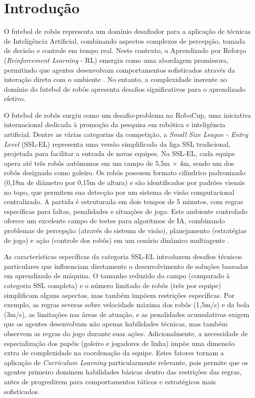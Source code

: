 \chapter{Introdução}
\label{cap:intro}

O futebol de robôs representa um domínio desafiador para a aplicação de técnicas de Inteligência Artificial, combinando aspectos complexos de percepção, tomada de decisão e controle em tempo real. Neste contexto, o Aprendizado por Reforço (\textit{Reinforcement Learning} - RL) emergiu como uma abordagem promissora, permitindo que agentes desenvolvam comportamentos sofisticados através da interação direta com o ambiente \cite{sutton}. No entanto, a complexidade inerente ao domínio do futebol de robôs apresenta desafios significativos para o aprendizado efetivo.

O futebol de robôs surgiu como um desafio-problema na RoboCup, uma iniciativa internacional dedicada à promoção da pesquisa em robótica e inteligência artificial. Dentre as várias categorias da competição, a \textit{Small Size League - Entry Level} (SSL-EL) representa uma versão simplificada da liga SSL tradicional, projetada para facilitar a entrada de novas equipes. Na SSL-EL, cada equipe opera até três robôs autônomos em um campo de 5,5m × 4m, sendo um dos robôs designado como goleiro. Os robôs possuem formato cilíndrico padronizado (0,18m de diâmetro por 0,15m de altura) e são identificados por padrões visuais no topo, que permitem sua detecção por um sistema de visão computacional centralizado. A partida é estruturada em dois tempos de 5 minutos, com regras específicas para faltas, penalidades e situações de jogo. Este ambiente controlado oferece um excelente campo de testes para algoritmos de IA, combinando problemas de percepção (através do sistema de visão), planejamento (estratégias de jogo) e ação (controle dos robôs) em um cenário dinâmico multiagente \cite{regras_ssl_el_2024}.

As características específicas da categoria SSL-EL introduzem desafios técnicos particulares que influenciam diretamente o desenvolvimento de soluções baseadas em aprendizado de máquina. O tamanho reduzido do campo (comparado à categoria SSL completa) e o número limitado de robôs (três por equipe) simplificam alguns aspectos, mas também impõem restrições específicas. Por exemplo, as regras severas sobre velocidade máxima dos robôs (1,5m/s) e da bola (3m/s), as limitações nas áreas de atuação, e as penalidades acumulativas exigem que os agentes desenvolvam não apenas habilidades técnicas, mas também observem as regras do jogo durante suas ações. Adicionalmente, a necessidade de especialização dos papéis (goleiro e jogadores de linha) impõe uma dimensão extra de complexidade na coordenação da equipe. Estes fatores tornam a aplicação de \textit{Curriculum Learning} particularmente relevante, pois permite que os agentes primeiro dominem habilidades básicas dentro das restrições das regras, antes de progredirem para comportamentos táticos e estratégicos mais sofisticados.

